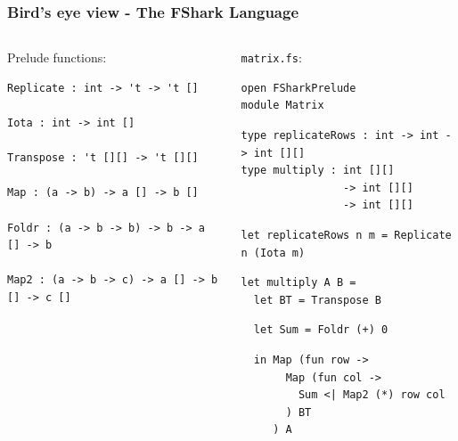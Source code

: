 \documentclass[10pt, compress]{beamer}
\begin{document}
\begin{frame}
  \frametitle{Bird's eye view - The FShark Language}
\begin{columns}[T] %
\begin{column}{.48\textwidth}
Prelude functions:\\
\begin{verbatim}
Replicate : int -> 't -> 't []

Iota : int -> int []

Transpose : 't [][] -> 't [][]

Map : (a -> b) -> a [] -> b []

Foldr : (a -> b -> b) -> b -> a [] -> b

Map2 : (a -> b -> c) -> a [] -> b [] -> c []
\end{verbatim}
\end{column}%
\hfill%
\pause
\begin{column}{.48\textwidth}
\texttt{matrix.fs}:
\begin{verbatim}
open FSharkPrelude
module Matrix
\end{verbatim}
\pause
\begin{verbatim}
type replicateRows : int -> int -> int [][] 
type multiply : int [][] 
                -> int [][] 
                -> int [][]
\end{verbatim}
\pause
\begin{verbatim}
let replicateRows n m = Replicate n (Iota m)
\end{verbatim}
\pause
\begin{verbatim}
let multiply A B =
  let BT = Transpose B
\end{verbatim}
\pause
\begin{verbatim}
  let Sum = Foldr (+) 0
\end{verbatim}
\pause
\begin{verbatim}
  in Map (fun row ->
       Map (fun col -> 
         Sum <| Map2 (*) row col
       ) BT
     ) A
\end{verbatim}
\end{column}%
\end{columns}
\end{frame}
\end{document}
